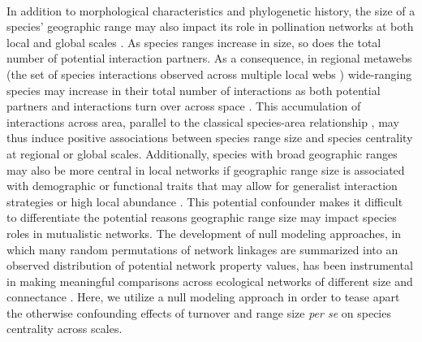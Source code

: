 \paragraph*{}
In addition to morphological characteristics and phylogenetic history, the size of a species' geographic range may also impact its role in pollination networks at both local and global scales \parencite{moulatlet2023species, dattilo2020species}. 
As species ranges increase in size, so does the total number of potential interaction partners. As a consequence, in regional metawebs (the set of species interactions observed across multiple local webs \parencite{poisot2012dissimilarity}) wide-ranging species may increase in their total number of interactions as both potential partners and interactions turn over across space \parencite{fricke2020accelerating, martins2022global}. 
This accumulation of interactions across area, parallel to the classical species-area relationship \parencite{burkle2012shifts,sugiura2012scale, galiana2018spatial, dallas2021species}, may thus induce positive associations between species range size and species centrality at regional or global scales.
Additionally, species with broad geographic ranges may also be more central in local networks if geographic range size is associated with demographic or functional traits that may allow for generalist interaction strategies or high local abundance \parencite{holt1997relationship, hurtado2024generalism, Moulatlet2025General}. This potential confounder makes it difficult to differentiate the potential reasons geographic range size may impact species roles in mutualistic networks. The development of null modeling approaches, in which many random permutations of network linkages are summarized into an observed distribution of potential network property values, has been instrumental in making meaningful comparisons across ecological networks of different size and connectance \parencite{dormann2017, guimaraes2020structure, bluthgen2024critical}. Here, we utilize a null modeling approach in order to tease apart the otherwise confounding effects of turnover and range size \textit{per se} on species centrality across scales. 




